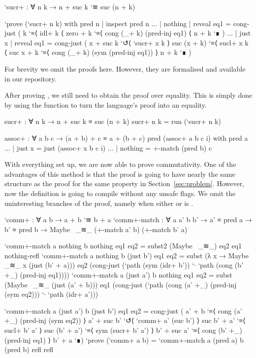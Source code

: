 \begin{code}
`sucr+ : ∀ n k → n + suc k `≋ suc (n + k)
\end{code}
\begin{code}[hide]
`prove (`sucr+ n k) with pred n | inspect pred n
... | nothing | reveal eq1 = cong-just (
  k
    `≡⟨ idl+ k ⟨
  zero + k
    `≡⟨ cong (_+ k) (pred-inj eq1) ⟨
  n + k `∎
  )
... | just x  | reveal eq1 = cong-just (
  x + suc k
    `↺⟨ `sucr+ x k ⟩
  suc (x + k)
    `≡⟨ sucl+ x k ⟨
  suc x + k
    `≡⟨ cong (_+ k) (sym (pred-inj eq1)) ⟩
  n + k `∎
  )
\end{code}

For brevity we omit the proofs here. However, they are formalised and available in our repository.

After proving , we still need to obtain the proof over equality.
This is simply done by using the  function to turn the language's proof
into an equality.

\begin{code}
sucr+ : ∀ n k → n + suc k ≡ suc (n + k)
sucr+ n k = run (`sucr+ n k)
\end{code}
\begin{code}[hide]
assoc+ : ∀ a b c → (a + b) + c ≡ a + (b + c)
pred (assoc+ a b c i) with pred a
... | just x = just (assoc+ x b c i)
... | nothing = +-match (pred b) c
\end{code}

With everything set up, we are now able to prove commutativity. One of the advantages
of this method is that the proof is going to have nearly the same structure as the proof
for the same property in Section~\ref{sec:problem}. However, now the definition is going to
compile without any unsafe flags. We omit the uninteresting branches of the proof, namely when either
 or  is .

\begin{code}
`comm+ : ∀ a b → a + b `≋ b + a
`comm+-match :
  ∀ a a' b b' → a' ≡ pred a → b' ≡ pred b →
  Maybe~ _≋_ (+-match a' b) (+-match b' a)
\end{code}
\begin{code}[hide]
`comm+-match a nothing b nothing eq1 eq2 = subst2 (Maybe~ _≋_) eq2 eq1 nothing-refl
`comm+-match a nothing b (just b') eq1 eq2 = subst (λ x → Maybe~ _≋_ x (just (b' + a))) eq2 (cong-just (`path (sym (idr+ b')) `∙ `path (cong (b' +_) (pred-inj eq1))))
`comm+-match a (just a') b nothing eq1 eq2 = subst (Maybe~ _≋_ (just (a' + b))) eq1 (cong-just (`path (cong (a' +_) (pred-inj (sym eq2))) `∙ `path (idr+ a')))
\end{code}
\begin{code}
`comm+-match a (just a') b (just b') eq1 eq2 =
  cong-just
    ( a' + b         `≡⟨ cong (a' +_) (pred-inj (sym eq2)) ⟩
      a' + suc b'    `↺⟨ `comm+ a' (suc b') ⟩
      suc b' + a'    `≡⟨ sucl+ b' a' ⟩
      suc (b' + a')  `≡⟨ sym (sucr+ b' a') ⟩
      b' + suc a'    `≡⟨ cong (b' +_) (pred-inj eq1) ⟩
      b' + a `∎)
`prove (`comm+ a b) =
  `comm+-match a (pred a) b (pred b) refl refl
\end{code}

